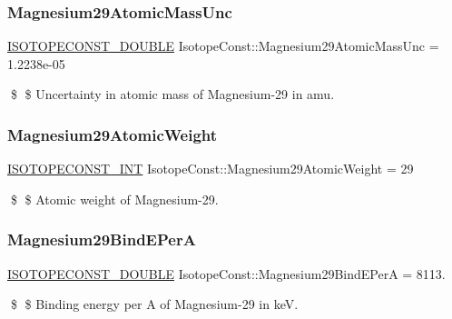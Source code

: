 \subsubsection{\texorpdfstring{Magnesium29\+Atomic\+Mass\+Unc}{Magnesium29AtomicMassUnc}}
{\footnotesize\ttfamily \mbox{\hyperlink{group___isotope_const-_macros_ga8f45a7272ce02c0b4c65c44636ed719a}{I\+S\+O\+T\+O\+P\+E\+C\+O\+N\+S\+T\+\_\+\+D\+O\+U\+B\+LE}} Isotope\+Const\+::\+Magnesium29\+Atomic\+Mass\+Unc = 1.\+2238e-\/05}

\$ \$ Uncertainty in atomic mass of Magnesium-\/29 in amu. \mbox{\label{group___isotope_const-_magnesium-_mg29_ga350865d9d217e4dd98a825457e3f3d15}} 
\subsubsection{\texorpdfstring{Magnesium29\+Atomic\+Weight}{Magnesium29AtomicWeight}}
{\footnotesize\ttfamily \mbox{\hyperlink{group___isotope_const-_macros_ga5f18360b3e99483a35c32d789e62621c}{I\+S\+O\+T\+O\+P\+E\+C\+O\+N\+S\+T\+\_\+\+I\+NT}} Isotope\+Const\+::\+Magnesium29\+Atomic\+Weight = 29}

\$ \$ Atomic weight of Magnesium-\/29. \mbox{\label{group___isotope_const-_magnesium-_mg29_ga3f26d33dfe801ba90cdd730f97cf6714}} 
\subsubsection{\texorpdfstring{Magnesium29\+Bind\+E\+PerA}{Magnesium29BindEPerA}}
{\footnotesize\ttfamily \mbox{\hyperlink{group___isotope_const-_macros_ga8f45a7272ce02c0b4c65c44636ed719a}{I\+S\+O\+T\+O\+P\+E\+C\+O\+N\+S\+T\+\_\+\+D\+O\+U\+B\+LE}} Isotope\+Const\+::\+Magnesium29\+Bind\+E\+PerA = 8113.}

\$ \$ Binding energy per A of Magnesium-\/29 in keV. \mbox{\label{group___isotope_const-_magnesium-_mg29_ga39395a7ccf3982932bec4396f95a395a}} 
